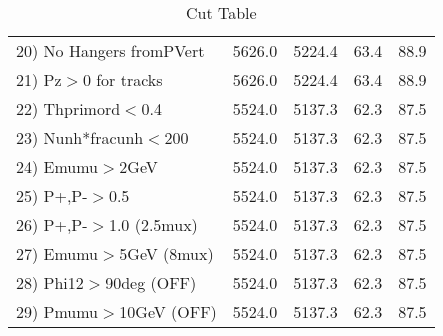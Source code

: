 \begin{table}[h!]
\begin{tabular}{||l||r|r|r|r||}
 20) No Hangers fromPVert &      5626.0 &      5224.4 &        63.4 &        88.9 \\
 21) Pz$>$0 for tracks    &      5626.0 &      5224.4 &        63.4 &        88.9 \\
 22) Thprimord$<$0.4      &      5524.0 &      5137.3 &        62.3 &        87.5 \\
 23) Nunh*fracunh$<$200   &      5524.0 &      5137.3 &        62.3 &        87.5 \\
 24) Emumu$>$2GeV         &      5524.0 &      5137.3 &        62.3 &        87.5 \\
 25) P+,P-$>$0.5          &      5524.0 &      5137.3 &        62.3 &        87.5 \\
 26) P+,P-$>$1.0 (2.5mux) &      5524.0 &      5137.3 &        62.3 &        87.5 \\
 27) Emumu$>$5GeV  (8mux) &      5524.0 &      5137.3 &        62.3 &        87.5 \\
 28) Phi12$>$90deg  (OFF) &      5524.0 &      5137.3 &        62.3 &        87.5 \\
 29) Pmumu$>$10GeV  (OFF) &      5524.0 &      5137.3 &        62.3 &        87.5 \\
 \hline
 \hline
 \end{tabular}
 \caption{Cut Table \cohpip }
 \label{tab-cut_copip}
 \end{table}
